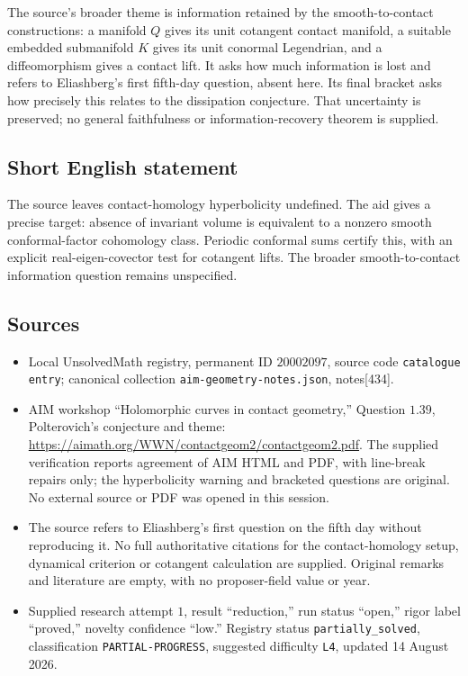 \documentclass[11pt]{article}
\begin{document}
The source's broader theme is information retained by the smooth-to-contact constructions: a manifold \(Q\) gives its unit cotangent contact manifold, a suitable embedded submanifold \(K\) gives its unit conormal Legendrian, and a diffeomorphism gives a contact lift. It asks how much information is lost and refers to Eliashberg's first fifth-day question, absent here. Its final bracket asks how precisely this relates to the dissipation conjecture. That uncertainty is preserved; no general faithfulness or information-recovery theorem is supplied.
\subsection{Short English statement}
The source leaves contact-homology hyperbolicity undefined. The aid gives a precise target: absence of invariant volume is equivalent to a nonzero smooth conformal-factor cohomology class. Periodic conformal sums certify this, with an explicit real-eigen-covector test for cotangent lifts. The broader smooth-to-contact information question remains unspecified.
\subsection{Sources}
\begin{itemize}
\item Local UnsolvedMath registry, permanent ID \(20002097\), source code \texttt{catalogue entry}; canonical collection \texttt{aim-geometry-notes.json}, notes[434].
\item AIM workshop ``Holomorphic curves in contact geometry,'' Question \(1.39\), Polterovich's conjecture and theme: \url{https://aimath.org/WWN/contactgeom2/contactgeom2.pdf}. The supplied verification reports agreement of AIM HTML and PDF, with line-break repairs only; the hyperbolicity warning and bracketed questions are original. No external source or PDF was opened in this session.
\item The source refers to Eliashberg's first question on the fifth day without reproducing it. No full authoritative citations for the contact-homology setup, dynamical criterion or cotangent calculation are supplied. Original remarks and literature are empty, with no proposer-field value or year.
\item Supplied research attempt \(1\), result ``reduction,'' run status ``open,'' rigor label ``proved,'' novelty confidence ``low.'' Registry status \texttt{partially\_solved}, classification \texttt{PARTIAL-PROGRESS}, suggested difficulty \texttt{L4}, updated 14 August 2026.
\end{itemize}
\end{document}
